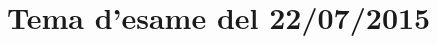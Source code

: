 \documentclass[main.tex]{subfiles}
\begin{document}
\section{Tema d'esame del 22/07/2015}


\clearpage

\clearpage

\end{document}
